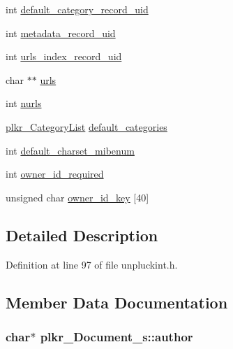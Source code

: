 \begin{DoxyCompactItemize}
\item 
int \hyperlink{structplkr__Document__s_aa5adb5548f84752427b973f322f153ec}{default\+\_\+category\+\_\+record\+\_\+uid}
\item 
int \hyperlink{structplkr__Document__s_a19ab77ee9af9fe9a77aa06713b84a750}{metadata\+\_\+record\+\_\+uid}
\item 
int \hyperlink{structplkr__Document__s_af14f8f1e3c2eea6814bc94aff2ec428c}{urls\+\_\+index\+\_\+record\+\_\+uid}
\item 
char $\ast$$\ast$ \hyperlink{structplkr__Document__s_a5ada88486c1d6db75aafd17b23fe17db}{urls}
\item 
int \hyperlink{structplkr__Document__s_a9ed11d122b2fe4b200fb727486501041}{nurls}
\item 
\hyperlink{unpluck_8h_a705714ac742bd9800de81b487a71de96}{plkr\+\_\+\+Category\+List} \hyperlink{structplkr__Document__s_a2f029383d0943d3be079d88a3dccf8f3}{default\+\_\+categories}
\item 
int \hyperlink{structplkr__Document__s_a588365c6be19fc1264b2549aed61d9d0}{default\+\_\+charset\+\_\+mibenum}
\item 
int \hyperlink{structplkr__Document__s_a5527d32cc4c4f3694a36fdcd96744905}{owner\+\_\+id\+\_\+required}
\item 
unsigned char \hyperlink{structplkr__Document__s_a7d7964829f29daa29f9d535723d638dc}{owner\+\_\+id\+\_\+key} \mbox{[}40\mbox{]}
\end{DoxyCompactItemize}


\subsection{Detailed Description}


Definition at line 97 of file unpluckint.\+h.



\subsection{Member Data Documentation}
\hypertarget{structplkr__Document__s_a8347ae3e4ab58977de561cdc2877b93f}{
\subsubsection[{author}]{\setlength{\rightskip}{0pt plus 5cm}char$\ast$ plkr\+\_\+\+Document\+\_\+s\+::author}}\label{structplkr__Document__s_a8347ae3e4ab58977de561cdc2877b93f}


